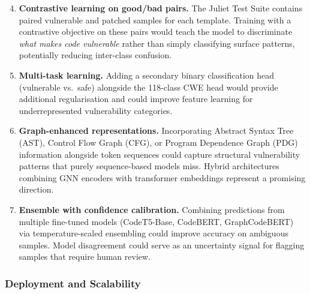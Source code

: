 \begin{enumerate}
    \setcounter{enumi}{3}
    \item \textbf{Contrastive learning on good/bad pairs.}
          The Juliet Test Suite contains paired vulnerable and patched
          samples for each template.  Training with a contrastive objective
          on these pairs would teach the model to discriminate
          \emph{what makes code vulnerable} rather than simply classifying
          surface patterns, potentially reducing inter-class confusion.

    \item \textbf{Multi-task learning.}
          Adding a secondary binary classification head (vulnerable vs.\
          safe) alongside the 118-class CWE head would provide additional
          regularisation and could improve feature learning for
          underrepresented vulnerability categories.

    \item \textbf{Graph-enhanced representations.}
          Incorporating Abstract Syntax Tree (AST), Control Flow Graph
          (CFG), or Program Dependence Graph (PDG) information alongside
          token sequences could capture structural vulnerability patterns
          that purely sequence-based models miss.  Hybrid architectures
          combining GNN encoders with transformer embeddings represent a
          promising direction.

    \item \textbf{Ensemble with confidence calibration.}
          Combining predictions from multiple fine-tuned models (CodeT5-Base,
          CodeBERT, GraphCodeBERT) via temperature-scaled ensembling could
          improve accuracy on ambiguous samples.  Model disagreement could
          serve as an uncertainty signal for flagging samples that require
          human review.
\end{enumerate}

\subsubsection{Deployment and Scalability}

